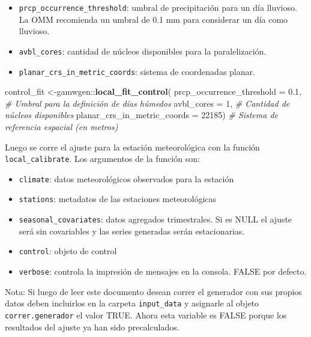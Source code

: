 \documentclass[
]{article}
\newenvironment{Shaded}{}{}
\newcommand{\CommentTok}[1]{\textcolor[rgb]{0.38,0.63,0.69}{\textit{#1}}}
\newcommand{\DataTypeTok}[1]{\textcolor[rgb]{0.56,0.13,0.00}{#1}}
\newcommand{\DecValTok}[1]{\textcolor[rgb]{0.25,0.63,0.44}{#1}}
\newcommand{\FloatTok}[1]{\textcolor[rgb]{0.25,0.63,0.44}{#1}}
\newcommand{\KeywordTok}[1]{\textcolor[rgb]{0.00,0.44,0.13}{\textbf{#1}}}
\newcommand{\NormalTok}[1]{#1}
\newcommand{\OperatorTok}[1]{\textcolor[rgb]{0.40,0.40,0.40}{#1}}
\providecommand{\tightlist}{%
  \setlength{\itemsep}{0pt}\setlength{\parskip}{0pt}}
\begin{document}
\begin{itemize}
\tightlist
\item
  \texttt{prcp\_occurrence\_threshold}: umbral de precipitación para un día lluvioso. La OMM recomienda un umbral de 0.1 mm para considerar un día como lluvioso.
\item
  \texttt{avbl\_cores}: cantidad de núcleos disponibles para la paralelización.
\item
  \texttt{planar\_crs\_in\_metric\_coords}: sistema de coordenadas planar.
\end{itemize}

\begin{Shaded}
\begin{Highlighting}[]
\NormalTok{control_fit <-gamwgen}\OperatorTok{::}\KeywordTok{local_fit_control}\NormalTok{(}
  \DataTypeTok{prcp_occurrence_threshold =} \FloatTok{0.1}\NormalTok{, }\CommentTok{# Umbral para la definición de días húmedos}
  \DataTypeTok{avbl_cores =} \DecValTok{1}\NormalTok{, }\CommentTok{# Cantidad de núcleos disponibles}
  \DataTypeTok{planar_crs_in_metric_coords =} \DecValTok{22185}\NormalTok{) }\CommentTok{# Sistema de referencia espacial (en metros)}
\end{Highlighting}
\end{Shaded}

Luego se corre el ajuste para la estación meteorológica con la función \texttt{local\_calibrate}. Los argumentos de la función son:

\begin{itemize}
\tightlist
\item
  \texttt{climate}: datos meteorológicos observados para la estación
\item
  \texttt{stations}: metadatos de las estaciones meteorológicas
\item
  \texttt{seasonal\_covariates}: datos agregados trimestrales. Si es NULL el ajuste será sin covariables y las series generadas serán estacionarias.
\item
  \texttt{control}: objeto de control
\item
  \texttt{verbose}: controla la impresión de mensajes en la consola. FALSE por defecto.
\end{itemize}

Nota: Si luego de leer este documento desean correr el generador con sus propios datos deben incluirlos en la carpeta \texttt{input\_data} y asignarle al objeto \texttt{correr.generador} el valor TRUE. Ahora esta variable es FALSE porque los resultados del ajuste ya han sido precalculados.
\end{document}
